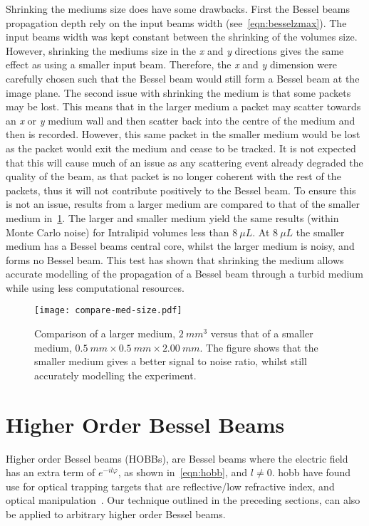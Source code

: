 Shrinking the mediums size does have some drawbacks.
First the Bessel beams propagation depth rely on the input beams width (see~\cref{eqn:besselzmax}).
The input beams width was kept constant between the shrinking of the volumes size.
However, shrinking the mediums size in the \textit{x} and \textit{y} directions gives the same effect as using a smaller input beam.
Therefore, the \textit{x} and \textit{y} dimension were carefully chosen such that the Bessel beam would still form a Bessel beam at the image plane.
The second issue with shrinking the medium is that some packets may be lost.
This means that in the larger medium a packet may scatter towards an \textit{x} or \textit{y} medium wall and then scatter back into the centre of the medium and then is recorded.
However, this same packet in the smaller medium would be lost as the packet would exit the medium and cease to be tracked.
It is not expected that this will cause much of an issue as any scattering event already degraded the quality of the beam, as that packet is no longer coherent with the rest of the packets, thus it will not contribute positively to the Bessel beam.
To ensure this is not an issue, results from a larger medium are compared to that of the smaller medium in~\cref{fig:compareBigSmall}.
The larger and smaller medium yield the same results (within Monte Carlo noise) for Intralipid volumes less than $8~\mu L$.
At $8~\mu L$ the smaller medium has a Bessel beams central core, whilst the larger medium is noisy, and forms no Bessel beam.
This test has shown that shrinking the medium allows accurate modelling of the propagation of a Bessel beam through a turbid medium while using less computational resources.

\begin{figure}[!ht]
    \centering
    \texttt{[image: compare-med-size.pdf]}
    \caption{Comparison of a larger medium, $2~mm^3$ versus that of a smaller medium, $0.5~mm \times 0.5~mm \times 2.00~mm$. The figure shows that the smaller medium gives a better signal to noise ratio, whilst still accurately modelling the experiment.}
    \label{fig:compareBigSmall}
\end{figure}

\FloatBarrier

\section{Higher Order Bessel Beams}

Higher order Bessel beams (HOBBs), are Bessel beams where the electric field has an extra term of $e^{-il\varphi}$, as shown in~\cref{eqn:hobb}, and $l \neq 0$.
\Gls*{hobb} have found use for optical trapping targets that are reflective/low refractive index, and optical manipulation~\cite{garces2002transfer,garces2003observation}.
Our technique outlined in the preceding sections, can also be applied to arbitrary higher order Bessel beams. 

